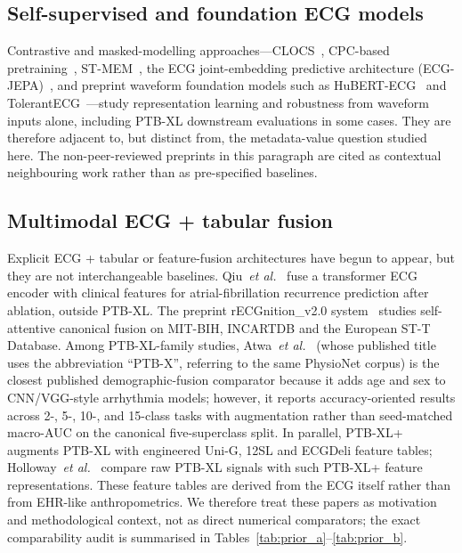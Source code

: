 \documentclass[mathematics,article,submit,pdftex]{Definitions/mdpi}
\begin{document}
\subsection{Self-supervised and foundation ECG models}
Contrastive and masked-modelling approaches---CLOCS~\cite{Kiyasseh2021}, CPC-based pretraining~\cite{Mehari2022}, ST-MEM~\cite{Na2024}, the ECG joint-embedding predictive architecture (ECG-JEPA)~\cite{Weimann2025}, and preprint waveform foundation models such as HuBERT-ECG~\cite{Coppola2024} and TolerantECG~\cite{Nguyen2025}---study representation learning and robustness from waveform inputs alone, including PTB-XL downstream evaluations in some cases. They are therefore adjacent to, but distinct from, the metadata-value question studied here. The non-peer-reviewed preprints in this paragraph are cited as contextual neighbouring work rather than as pre-specified baselines.

\subsection{Multimodal ECG + tabular fusion}
Explicit ECG + tabular or feature-fusion architectures have begun to appear, but they are not interchangeable baselines. Qiu~\textit{et al.}~\cite{Qiu2024} fuse a transformer ECG encoder with clinical features for atrial-fibrillation recurrence prediction after ablation, outside PTB-XL. The preprint rECGnition\_v2.0 system~\cite{Srivastava2025} studies self-attentive canonical fusion on MIT-BIH, INCARTDB and the European ST-T Database. Among PTB-XL-family studies, Atwa~\textit{et al.}~\cite{Atwa2025} (whose published title uses the abbreviation ``PTB-X'', referring to the same PhysioNet corpus) is the closest published demographic-fusion comparator because it adds age and sex to CNN/VGG-style arrhythmia models; however, it reports accuracy-oriented results across 2-, 5-, 10-, and 15-class tasks with augmentation rather than seed-matched macro-AUC on the canonical five-superclass split. In parallel, PTB-XL+~\cite{Strodthoff2023PTBXLPlus} augments PTB-XL with engineered Uni-G, 12SL and ECGDeli feature tables; Holloway~\textit{et al.}~\cite{Holloway2026} compare raw PTB-XL signals with such PTB-XL+ feature representations. These feature tables are derived from the ECG itself rather than from EHR-like anthropometrics. We therefore treat these papers as motivation and methodological context, not as direct numerical comparators; the exact comparability audit is summarised in Tables~\ref{tab:prior_a}--\ref{tab:prior_b}.
\end{document}
